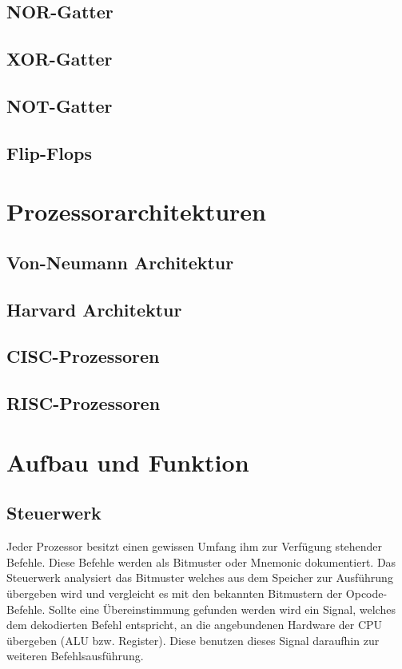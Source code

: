 \documentclass[12pt]{article}
\begin{document}
\subsection{NOR-Gatter}
\subsection{XOR-Gatter}
\subsection{NOT-Gatter}
\subsection{Flip-Flops}

\section{Prozessorarchitekturen}
\subsection{Von-Neumann Architektur}
\subsection{Harvard Architektur}
\subsection{CISC-Prozessoren}
\subsection{RISC-Prozessoren}

\section{Aufbau und Funktion}
\subsection{Steuerwerk}
Jeder Prozessor besitzt einen gewissen Umfang ihm zur Verfügung stehender Befehle. Diese Befehle werden als Bitmuster oder Mnemonic dokumentiert. 
Das Steuerwerk analysiert das Bitmuster welches aus dem Speicher zur Ausführung übergeben wird und vergleicht es mit den bekannten Bitmustern der Opcode-Befehle. Sollte eine Übereinstimmung gefunden werden wird ein Signal, welches dem dekodierten Befehl entspricht, an die angebundenen Hardware der CPU übergeben (ALU bzw. Register). Diese benutzen dieses Signal daraufhin zur weiteren Befehlsausführung.\cite{computerarchitecture2007}
\end{document}
